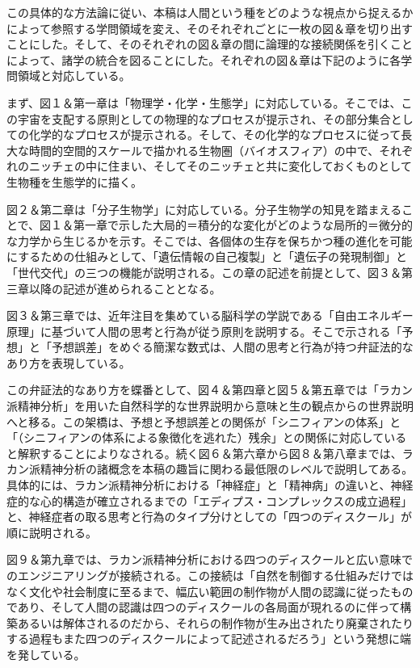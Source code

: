 この具体的な方法論に従い、本稿は人間という種をどのような視点から捉えるかによって参照する学問領域を変え、そのそれぞれごとに一枚の図＆章を切り出すことにした。そして、そのそれぞれの図＆章の間に論理的な接続関係を引くことによって、諸学の統合を図ることにした。それぞれの図＆章は下記のように各学問領域と対応している。

まず、図１＆第一章は「物理学・化学・生態学」に対応している。そこでは、この宇宙を支配する原則としての物理的なプロセスが提示され、その部分集合としての化学的なプロセスが提示される。そして、その化学的なプロセスに従って長大な時間的空間的スケールで描かれる生物圏（バイオスフィア）の中で、それぞれのニッチェの中に住まい、そしてそのニッチェと共に変化しておくものとして生物種を生態学的に描く。

図２＆第二章は「分子生物学」に対応している。分子生物学の知見を踏まえることで、図１＆第一章で示した大局的＝積分的な変化がどのような局所的＝微分的な力学から生じるかを示す。そこでは、各個体の生存を保ちかつ種の進化を可能にするための仕組みとして、「遺伝情報の自己複製」と「遺伝子の発現制御」と「世代交代」の三つの機能が説明される。この章の記述を前提として、図３＆第三章以降の記述が進められることとなる。

図３＆第三章では、近年注目を集めている脳科学の学説である「自由エネルギー原理」に基づいて人間の思考と行為が従う原則を説明する。そこで示される「予想」と「予想誤差」をめぐる簡潔な数式は、人間の思考と行為が持つ弁証法的なあり方を表現している。

この弁証法的なあり方を蝶番として、図４＆第四章と図５＆第五章では「ラカン派精神分析」を用いた自然科学的な世界説明から意味と生の観点からの世界説明へと移る。この架橋は、予想と予想誤差との関係が「シニフィアンの体系」と「（シニフィアンの体系による象徴化を逃れた）残余」との関係に対応していると解釈することによりなされる。続く図６＆第六章から図８＆第八章までは、ラカン派精神分析の諸概念を本稿の趣旨に関わる最低限のレベルで説明してある。具体的には、ラカン派精神分析における「神経症」と「精神病」の違いと、神経症的な心的構造が確立されるまでの「エディプス・コンプレックスの成立過程」と、神経症者の取る思考と行為のタイプ分けとしての「四つのディスクール」が順に説明される。

図９＆第九章では、ラカン派精神分析における四つのディスクールと広い意味でのエンジニアリングが接続される。この接続は「自然を制御する仕組みだけではなく文化や社会制度に至るまで、幅広い範囲の制作物が人間の認識に従ったものであり、そして人間の認識は四つのディスクールの各局面が現れるのに伴って構築あるいは解体されるのだから、それらの制作物が生み出されたり廃棄されたりする過程もまた四つのディスクールによって記述されるだろう」という発想に端を発している。

